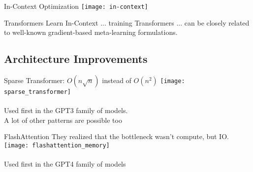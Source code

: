 \begin{frame}[c]{In-Context Optimization}
    \texttt{[image: in-context]} \\
        \begin{aquote}{Transformers Learn In-Context \cite{vonoswald_transformers_2022}}
            ... training Transformers ... can be closely related to well-known
            gradient-based meta-learning formulations.
        \end{aquote}
\end{frame}

\subsection{Architecture Improvements}
\begin{frame}[c]{Sparse Transformer: $O(n \sqrt{n})$ instead of $O(n^2)$}
    \texttt{[image: sparse\_transformer]} \\
    \normalsize
     \\
    \large
    Used first in the GPT3 family of models. \\
    A lot of other patterns are possible too
\end{frame}


\begin{frame}[c]{FlashAttention}
    \large
    They realized that the bottleneck wasn't compute, but IO. \\
    \texttt{[image: flashattention\_memory]} \\
     \\
    \large
    Used first in the GPT4 family of models
\end{frame}


